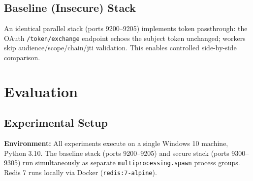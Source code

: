 \documentclass[journal]{IEEEtran}
\begin{document}
\subsection{Baseline (Insecure) Stack}

An identical parallel stack (ports 9200--9205) implements token passthrough: the OAuth \texttt{/token/exchange} endpoint echoes the subject token unchanged; workers skip audience/scope/chain/jti validation. This enables controlled side-by-side comparison.



\section{Evaluation}
\label{sec:evaluation}

\subsection{Experimental Setup}

\textbf{Environment:} All experiments execute on a single Windows 10 machine, Python 3.10. The baseline stack (ports 9200--9205) and secure stack (ports 9300--9305) run simultaneously as separate \texttt{multiprocessing.spawn} process groups. Redis 7 runs locally via Docker (\texttt{redis:7-alpine}).
\end{document}
